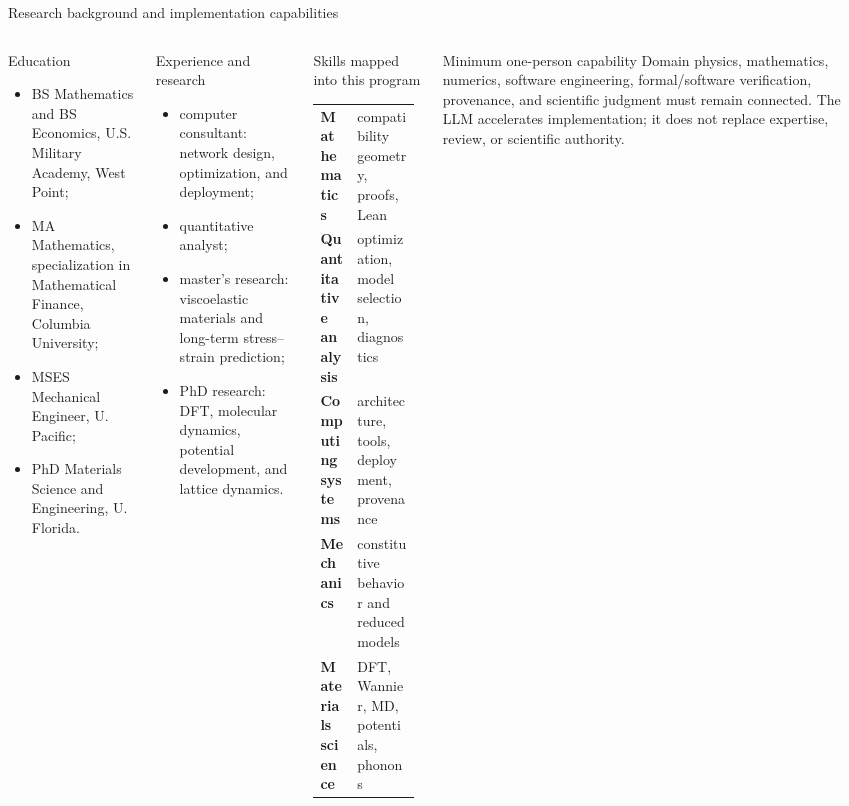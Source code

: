 \documentclass[aspectratio=169,10pt]{beamer}
\begin{document}
\begin{frame}{Research background and implementation capabilities}
  \begin{columns}[T,onlytextwidth]
      \begin{block}{Education}
        \scriptsize
        \begin{itemize}\setlength{\itemsep}{0.12em}
          \item BS Mathematics and BS Economics, U.S. Military Academy, West Point;
          \item MA Mathematics, specialization in Mathematical Finance,
            Columbia University;
          \item MSES Mechanical Engineer, U. Pacific;
          \item PhD Materials Science and Engineering, U. Florida.
        \end{itemize}
      \end{block}
      \begin{exampleblock}{Experience and research}
        \scriptsize
        \begin{itemize}\setlength{\itemsep}{0.12em}
          \item computer consultant: network design, optimization, and deployment;
          \item quantitative analyst;
          \item master's research: viscoelastic materials and long-term stress--strain prediction;
          \item PhD research: DFT, molecular dynamics, potential development, and lattice dynamics.
        \end{itemize}
      \end{exampleblock}
      \begin{block}{Skills mapped into this program}
        \scriptsize
        \begin{tabular}{@{}p{0.34\linewidth}p{0.59\linewidth}@{}}
          \textbf{Mathematics} & compatibility geometry, proofs, Lean \\[0.25em]
          \textbf{Quantitative analysis} & optimization, model selection, diagnostics \\[0.25em]
          \textbf{Computing systems} & architecture, tools, deployment, provenance \\[0.25em]
          \textbf{Mechanics} & constitutive behavior and reduced models \\[0.25em]
          \textbf{Materials science} & DFT, Wannier, MD, potentials, phonons
        \end{tabular}
      \end{block}
      \begin{alertblock}{Minimum one-person capability}
        \scriptsize
        Domain physics, mathematics, numerics, software engineering, formal/software
        verification, provenance, and scientific judgment must remain connected. The
        LLM accelerates implementation; it does not replace expertise, review, or
        scientific authority.
      \end{alertblock}
  \end{columns}
\end{frame}
\end{document}
